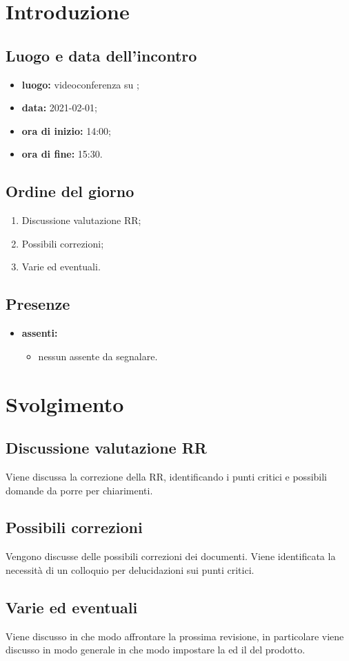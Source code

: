 \section*{Introduzione}
\subsection*{Luogo e data dell'incontro}
\begin{itemize}
	\item \textbf{luogo:} videoconferenza su ;
	\item \textbf{data:} 2021-02-01;
	\item \textbf{ora di inizio:} 14:00;
	\item \textbf{ora di fine:} 15:30.
\end{itemize}

\subsection*{Ordine del giorno}
\begin{enumerate}
	\item Discussione valutazione RR;
	\item Possibili correzioni;
	\item Varie ed eventuali.
\end{enumerate}

\subsection*{Presenze}
\begin{itemize}
	\item \textbf{assenti:}
	\begin{itemize}
		\item nessun assente da segnalare.
	\end{itemize}
\end{itemize}

\section*{Svolgimento}
\subsection*{Discussione valutazione RR}
Viene discussa la correzione della RR, identificando i punti critici e possibili domande da porre per chiarimenti.
\subsection*{Possibili correzioni}
Vengono discusse delle possibili correzioni dei documenti. Viene identificata la necessità di un colloquio per delucidazioni sui punti critici.
\subsection*{Varie ed eventuali}
Viene discusso in che modo affrontare la prossima revisione, in particolare viene discusso in modo generale in che modo impostare la  ed il  del prodotto.
